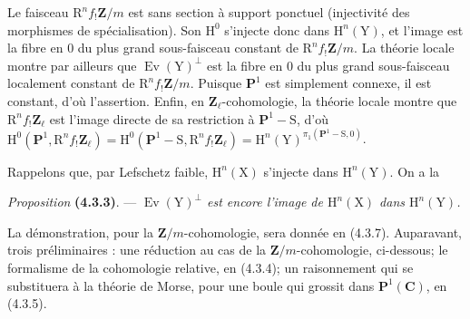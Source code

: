 \documentclass[11pt,leqno]{article}
\begin{document}
Le faisceau \(\mathrm{R}^n f_!\mathbf{Z}/m\) est sans section à support ponctuel (injectivité des morphismes de spécialisation). Son \(\mathrm{H}^0\) s’injecte donc dans \(\mathrm{H}^n(\mathrm{Y})\), et l’image est la fibre en \(0\) du plus grand sous-faisceau constant de \(\mathrm{R}^n f_!\mathbf{Z}/m\). La théorie locale montre par ailleurs que \(\operatorname{Ev}(\mathrm{Y})^\perp\) est la fibre en \(0\) du plus grand sous-faisceau localement constant de \(\mathrm{R}^n f_!\mathbf{Z}/m\). Puisque \(\mathbf{P}^1\) est simplement connexe, il est constant, d’où l’assertion. Enfin, en \(\mathbf{Z}_\ell\)-cohomologie, la théorie locale montre que \(\mathrm{R}^n f_!\mathbf{Z}_\ell\) est l’image directe de sa restriction à \(\mathbf{P}^1-\mathrm{S}\), d’où \(\mathrm{H}^0(\mathbf{P}^1,\mathrm{R}^n f_!\mathbf{Z}_\ell)=\mathrm{H}^0(\mathbf{P}^1-\mathrm{S},\mathrm{R}^n f_!\mathbf{Z}_\ell)=\mathrm{H}^n(\mathrm{Y})^{\pi_1(\mathbf{P}^1-\mathrm{S},0)}\).

Rappelons que, par Lefschetz faible, \(\mathrm{H}^n(\mathrm{X})\) s’injecte dans \(\mathrm{H}^n(\mathrm{Y})\). On a la

\textit{Proposition} \textbf{(4.3.3)}. — \textit{\(\operatorname{Ev}(\mathrm{Y})^\perp\) est encore l’image de \(\mathrm{H}^n(\mathrm{X})\) dans \(\mathrm{H}^n(\mathrm{Y})\).}

La démonstration, pour la \(\mathbf{Z}/m\)-cohomologie, sera donnée en (4.3.7). Auparavant, trois préliminaires : une réduction au cas de la \(\mathbf{Z}/m\)-cohomologie, ci-dessous; le formalisme de la cohomologie relative, en (4.3.4); un raisonnement qui se substituera à la théorie de Morse, pour une boule qui grossit dans \(\mathbf{P}^1(\mathbf{C})\), en (4.3.5).
\end{document}
